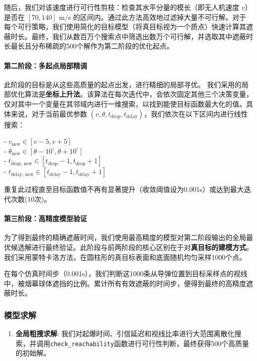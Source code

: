 \documentclass[12pt]{article}
\newcommand{\code}[1]{\texttt{#1}} %
\begin{document}
\begin{CJK}{UTF8}{gbsn}
	随后，我们对该速度进行可行性剪枝：检查其水平分量的模长（即无人机速度 $v$）是否在 $[70, 140]$ m/s 的区间内。通过此方法高效地过滤掉大量不可行解。对于每个可行策略，我们使用简化的目标模型（将真目标视为一个质点）快速计算其遮蔽时长。最终，我们从数百万个搜索点中筛选出数万个可行解，并选取其中遮蔽时长最长且分布稀疏的500个解作为第二阶段的优化起点。
	
	\paragraph{第二阶段：多起点局部精调}
	此阶段的目标是从这些高质量的起点出发，进行精细的局部寻优。
	我们采用的局部优化算法是\textbf{坐标上升法}。该算法在每次迭代中，会依次固定其他三个决策变量，仅对其中一个变量在其邻域内进行一维搜索，以找到能使目标函数最大化的值。具体来说，对于当前最优参数 $(v, \theta, t_{\text{drop}}, t_{\text{delay}})$，我们依次在以下区间内进行线性搜索：
	
		- $v_{\text{new}} \in [v-5, v+5]$\\
	\indent	- $\theta_{\text{new}} \in [\theta-10^\circ, \theta+10^\circ]$\\
	\indent	- $t_{\text{drop, new}} \in [t_{\text{drop}}-1, t_{\text{drop}}+1]$\\
	\indent	- $t_{\text{delay, new}} \in [t_{\text{delay}}-1, t_{\text{delay}}+1]$

	重复此过程直至目标函数值不再有显著提升（收敛阈值设为0.001s）或达到最大迭代次数(10次)。
	
	\paragraph{第三阶段：高精度模型验证}
	为了得到最终的精确遮蔽时间，我们使用最高精度的模型对第二阶段输出的全局最优候选解进行最终验证。此阶段与前两阶段的核心区别在于对\textbf{真目标的建模方式}。我们采用蒙特卡洛方法，在圆柱形的真目标表面和底面随机均匀采样1000个点。
	
	在每个仿真时间步（0.001s），我们判断这1000条从导弹位置到目标采样点的视线中，被烟幕球体遮挡的比例。累计所有有效遮蔽的时间步，便得到最终的高精度遮蔽时长。
	
	\subsubsection{模型求解}
	\begin{enumerate}
		\item \textbf{全局粗搜求解}: 我们对起爆时间、引信延迟和视线比率进行大范围离散化搜索，并调用\code{check\_reachability}函数进行可行性判断，最终获得500个高质量的初始解。
		

\end{enumerate}
\end{CJK}
\end{document}
